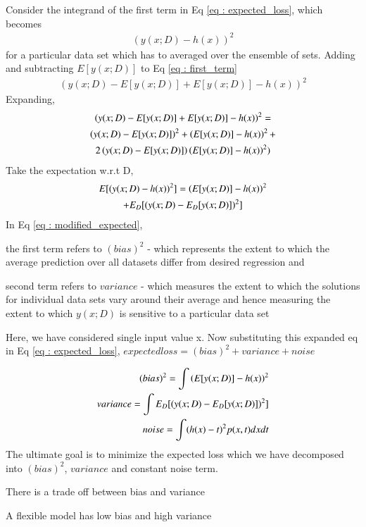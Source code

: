\documentclass[journal,12pt,twocolumn]{IEEEtran}
\begin{document}
Consider the integrand of the first term in Eq \eqref{eq : expected_loss}, which becomes
\begin{align}
    (y(x;D) - h(x))^2 \label{eq : first_term}
\end{align}
for a particular data set which has to averaged over the ensemble of sets.
Adding and subtracting $E[y(x;D)]$ to Eq \eqref{eq : first_term}
\begin{align}
    (y(x;D) - E[y(x;D)] + E[y(x;D)]- h(x))^2
\end{align}
Expanding,
\begin{multline}
    \left(y(x;D) - E[y(x;D)] + E[y(x;D)]- h(x)\right)^2 = \\
      \left(y(x;D) - E[y(x;D)]\right)^2 + \left(E[y(x;D)]- h(x)\right)^2 + \\
      2\left(y(x;D) - E[y(x;D)]\right)\left(E[y(x;D)]- h(x)\right)^2)
\end{multline}
Take the expectation w.r.t D,
\begin{multline}
    E[(y(x;D) - h(x))^2] = \left(E[y(x;D)]- h(x)\right)^2\\
       + E_{D}[(y(x;D) - E_{D}[y(x;D)])^2] \label{eq : modified_expected}
\end{multline}
In Eq \eqref{eq : modified_expected}, 

the first term refers to $(bias)^2$ - which represents the extent to which the average prediction over all datasets differ from desired regression and

second term refers to $variance$ - which measures the extent to which the solutions for individual data sets vary around their average and hence measuring the extent to which $y(x;D)$
is sensitive to a particular data set

Here, we have considered single input value x. Now substituting this expanded eq in Eq \eqref{eq : expected_loss},
$expected loss = (bias)^2 + variance + noise$

\begin{align}
    (bias)^2 = \int \left(E[y(x;D)]- h(x)\right)^2\\
    variance = \int E_{D}[(y(x;D) - E_{D}[y(x;D)])^2]\\
    noise = \int(h(x) - t)^2p(x,t)dx dt
\end{align}
The ultimate goal is to minimize the expected loss which we have decomposed into $(bias)^2$, $variance$ and constant noise term.

There is a trade off between bias and variance

A flexible model has low bias and high variance
\end{document}
